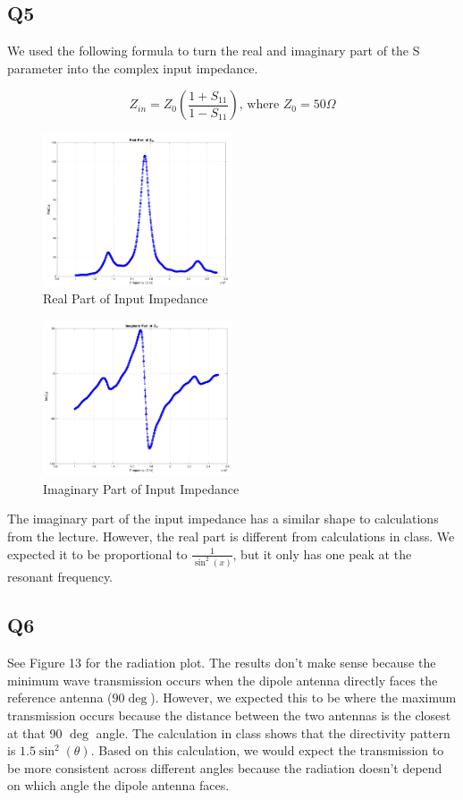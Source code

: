 \documentclass{article} %
\begin{document}
\subsection*{Q5}

We used the following formula to turn the real and imaginary part of the S parameter into the complex input impedance.

\[Z_{in} = Z_0 \left(\frac{1 + S_{11}}{1 - S_{11}}\right)\text{, where }Z_0 = 50 \Omega\]

\begin{figure}[H]
    \centering
    \includegraphics[width=0.5\textwidth]{./image/figure14.png}
    \caption{Real Part of Input Impedance}
\end{figure}

\begin{figure}[H]
    \centering
    \includegraphics[width=0.5\textwidth]{./image/figure15.png}
    \caption{Imaginary Part of Input Impedance}
\end{figure}

The imaginary part of the input impedance has a similar shape to calculations from the lecture.
However, the real part is different from calculations in class. We expected it to be proportional to $\frac{1}{\sin^2(x)}$, but it only has one peak at the resonant frequency.

\subsection*{Q6}
See Figure 13 for the radiation plot. The results don't make sense because the minimum wave transmission occurs when the dipole antenna directly faces the reference antenna ($90 \deg$). However, we expected this to be where the maximum transmission occurs because the distance between the two antennas is the closest at that 90 $\deg$ angle. The calculation in class shows that the directivity pattern is $1.5\sin^2(\theta)$. Based on this calculation, we would expect the transmission to be more consistent across different angles because the radiation doesn't depend on which angle the dipole antenna faces.
\end{document}
